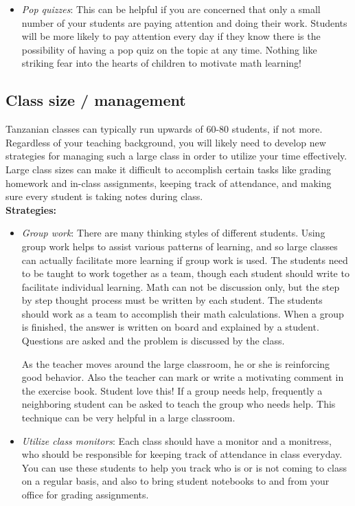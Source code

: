 \begin{itemize}
\item\emph{Pop quizzes}: This can be helpful if you are concerned that only a small number of your students are paying attention and doing their work. Students will be more likely to pay attention every day if they know there is the possibility of having a pop quiz on the topic at any time. Nothing like striking fear into the hearts of children to motivate math learning!
\end{itemize}

\subsection{Class size / management}
Tanzanian classes can typically run upwards of 60-80 students, if not more. Regardless of your teaching background, you will likely need to develop new strategies for managing such a large class in order to utilize your time effectively. Large class sizes can make it difficult to accomplish certain tasks like grading homework and in-class assignments, keeping track of attendance, and making sure every student is taking notes during class.\\

\textbf{Strategies:}
\begin{itemize}
\item\emph{Group work}: There are many thinking styles of different students. Using group work helps to assist various patterns of learning, and so large classes can actually facilitate more learning if group work is used. The students need to be taught to work together as a team, though each student should write to facilitate individual learning. Math can not be discussion only, but the step by step thought process must be written by each student. The students should work as a team to accomplish their math calculations. When a group is finished, the answer is written on board and explained by a student. Questions are asked and the problem is discussed by the class.

As the teacher moves around the large classroom, he or she is reinforcing good behavior. Also the teacher can mark or write a motivating comment in the exercise book. Student love this! If a group needs help, frequently a neighboring student can be asked to teach the group who needs help. This technique can be very helpful in a large classroom.

\item\emph{Utilize class monitors}: Each class should have a monitor and a monitress, who should be responsible for keeping track of attendance in class everyday. You can use these students to help you track who is or is not coming to class on a regular basis, and also to bring student notebooks to and from your office for grading assignments.
\end{itemize}

